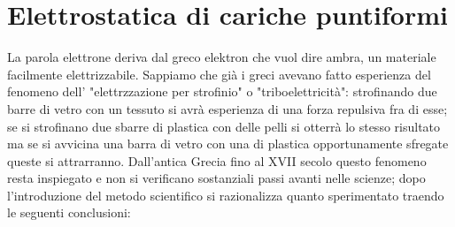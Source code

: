 \documentclass[
10pt, %
a4paper, %
oneside, %
headinclude,footinclude, %
BCOR5mm, %
]{scrartcl}
\begin{document}
	\setcounter{tocdepth}{2} %
	
	
	
	
	
	
	\newpage %
	\tableofcontents %
	\newpage

\section{Elettrostatica di cariche puntiformi}
La parola elettrone deriva dal greco elektron che vuol dire ambra, un materiale facilmente elettrizzabile. Sappiamo che già i greci avevano fatto esperienza del fenomeno dell' "elettrzzazione per strofinio" o "triboelettricità": strofinando due barre di vetro con un tessuto si avrà esperienza di una forza repulsiva fra di esse; se si strofinano due sbarre di plastica con delle pelli si otterrà lo stesso risultato ma se si avvicina una barra di vetro con una di plastica opportunamente sfregate queste si attrarranno. Dall'antica Grecia fino al XVII secolo questo fenomeno resta inspiegato e non si verificano sostanziali passi avanti nelle scienze; dopo l'introduzione del metodo scientifico si razionalizza quanto sperimentato traendo le seguenti conclusioni:
\end{document}
